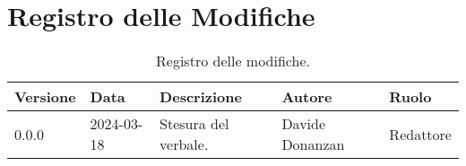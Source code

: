 \section*{Registro delle Modifiche}
\begin{table}[ht!]	
		\centering
		\begin{tabular}{p{1.2cm} p{2cm} p{6cm} p{3cm} p{2cm}}
			\toprule
			\textbf{Versione}& \textbf{Data} & \textbf{Descrizione} & \textbf{Autore} & \textbf{Ruolo} \\
			\midrule
			0.0.0 & 2024-03-18 & Stesura del verbale.  & Davide Donanzan &
			Redattore \\ %
			\bottomrule
		\end{tabular}
		\caption{Registro delle modifiche.}
		\label{table:Registro delle modifiche.}
\end{table}